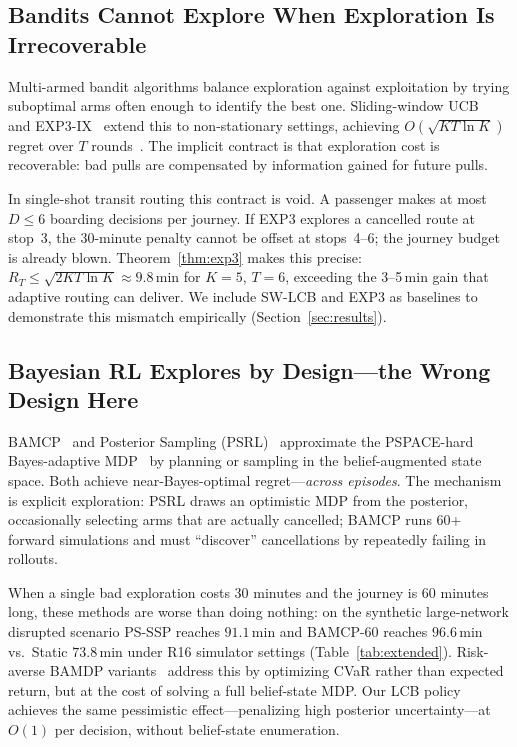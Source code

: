 \documentclass[11pt]{article}
\theoremstyle{definition}
\theoremstyle{remark}
\begin{document}
\subsection{Bandits Cannot Explore When Exploration Is Irrecoverable}

Multi-armed bandit algorithms balance exploration against exploitation by
trying suboptimal arms often enough to identify the best one.
Sliding-window UCB~\cite{garivier2011} and EXP3-IX~\cite{kocak2014} extend
this to non-stationary settings, achieving $O(\sqrt{KT\ln K})$ regret
over $T$ rounds~\cite{lai1985,chen2024}.
The implicit contract is that exploration cost is recoverable: bad pulls
are compensated by information gained for future pulls.

In single-shot transit routing this contract is void.
A passenger makes at most $D \leq 6$ boarding decisions per journey.
If EXP3 explores a cancelled route at stop~3, the 30-minute penalty
cannot be offset at stops~4--6; the journey budget is already blown.
Theorem~\ref{thm:exp3} makes this precise:
$R_T \leq \sqrt{2KT\ln K} \approx 9.8$\,min for $K{=}5$, $T{=}6$,
exceeding the 3--5\,min gain that adaptive routing can deliver.
We include SW-LCB and EXP3 as baselines to demonstrate this mismatch
empirically (Section~\ref{sec:results}).

\subsection{Bayesian RL Explores by Design---the Wrong Design Here}

BAMCP~\cite{guez2012} and Posterior Sampling (PSRL)~\cite{osband2017}
approximate the PSPACE-hard Bayes-adaptive MDP~\cite{duff2002} by
planning or sampling in the belief-augmented state space.
Both achieve near-Bayes-optimal regret---\emph{across episodes}.
The mechanism is explicit exploration: PSRL draws an optimistic MDP from
the posterior, occasionally selecting arms that are actually cancelled;
BAMCP runs 60+ forward simulations and must ``discover'' cancellations
by repeatedly failing in rollouts.

When a single bad exploration costs 30 minutes and the journey is 60
minutes long, these methods are worse than doing nothing:
on the synthetic large-network disrupted scenario PS-SSP reaches
$91.1$\,min and BAMCP-60 reaches $96.6$\,min vs.\ Static $73.8$\,min
under R16 simulator settings (Table~\ref{tab:extended}).
Risk-averse BAMDP variants~\cite{rigter2021,lin2022} address this by
optimizing CVaR rather than expected return, but at the cost of
solving a full belief-state MDP.
Our LCB policy achieves the same pessimistic effect---penalizing high
posterior uncertainty---at $O(1)$ per decision, without belief-state
enumeration.
\end{document}
